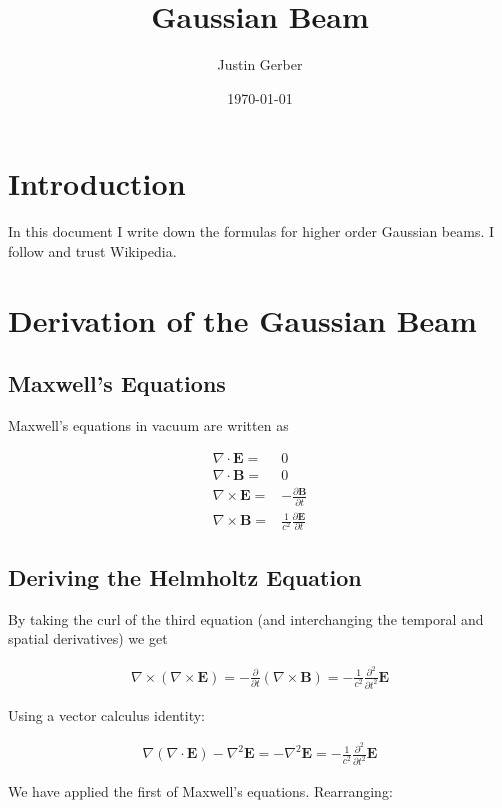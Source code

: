 \documentclass[12pt]{article}
\newcommand{\ppt}[1]{\frac{\partial #1}{\partial t}}
\newcommand{\bv}[1]{\boldsymbol{#1}}
\begin{document}
\title{Gaussian Beam}
\author{Justin Gerber}
\date{\today}
\maketitle

\section{Introduction}
In this document I write down the formulas for higher order Gaussian beams. I follow and trust Wikipedia.

\section{Derivation of the Gaussian Beam}

\subsection{Maxwell's Equations}
Maxwell's equations in vacuum are written as

\begin{align}
\nabla \cdot \bv{E} =& 0\\
\nabla \cdot \bv{B} =& 0\\
\nabla \times \bv{E} =& - \ppt{\bv{B}}\\
\nabla \times \bv{B} =& \frac{1}{c^2} \ppt{\bv{E}}
\end{align}

\subsection{Deriving the Helmholtz Equation}
By taking the curl of the third equation (and interchanging the temporal and spatial derivatives) we get

\begin{align}
\nabla \times \left( \nabla \times \bv{E}\right) = -\ppt{} \left(\nabla \times \bv{B}\right) = -\frac{1}{c^2} \frac{\partial^2}{\partial t^2} \bv{E}
\end{align}

Using a vector calculus identity:

\begin{align}
\nabla\left(\nabla \cdot \bv{E}\right) - \nabla^2 \bv{E} = -\nabla^2\bv{E} = -\frac{1}{c^2} \frac{\partial^2}{\partial t^2} \bv{E}
\end{align}

We have applied the first of Maxwell's equations.
Rearranging:
\end{document}

